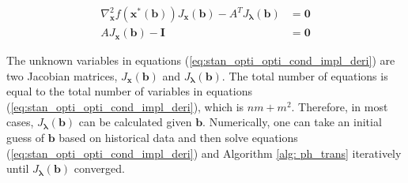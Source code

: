 \begin{subequations}\label{eq:stan_opti_opti_cond_impl_deri}
\begin{align}
\nabla^2_{\boldsymbol{x}} f(\boldsymbol{x^{\ast}}(\boldsymbol{b})) J_{\boldsymbol{x}}(\boldsymbol{b}) - A^T J_{\boldsymbol{\lambda}}(\boldsymbol{b}) &= \boldsymbol{0}\label{stan_opti_opti_cond1_impl_deri}\\
AJ_{\boldsymbol{x}}(\boldsymbol{b})-\boldsymbol{I} &= \boldsymbol{0}\label{stan_opti_opti_cond2_impl_deri}
\end{align}
\end{subequations}

The unknown variables in equations (\ref{eq:stan_opti_opti_cond_impl_deri}) are two Jacobian matrices, $J_{\boldsymbol{x}}(\boldsymbol{b})$ and $J_{\boldsymbol{\lambda}}(\boldsymbol{b})$. The total number of equations is equal to the total number of variables in equations (\ref{eq:stan_opti_opti_cond_impl_deri}), which is $nm+m^2$. Therefore, in most cases, $J_{\boldsymbol{\lambda}}(\boldsymbol{b})$ can be calculated given $\boldsymbol{b}$. Numerically, one can take an initial guess of $\boldsymbol{b}$ based on historical data and then solve equations (\ref{eq:stan_opti_opti_cond_impl_deri}) and Algorithm \ref{alg: ph_trans} iteratively until $J_{\boldsymbol{\lambda}}(\boldsymbol{b})$ converged.




